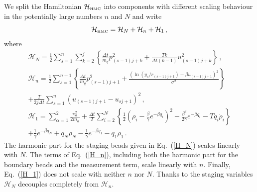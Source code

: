 \documentclass[12pt,a4paper,final]{iopart}
\begin{document}
We split the Hamiltonian $\mathcal{H}_{\mbox{\tiny HMC}}$ into components with different scaling behaviour in the potentially large numbers $n$ and $N$ and write
\begin{equation}
  \mathcal{H}_{\mbox{\tiny HMC}}= \mathcal H_N+\mathcal H_n+\mathcal H_1\,,
\end{equation}
where
\begin{eqnarray}
  \mathcal H_N =
  \frac{1}{2}
  \sum_{s=1}^{n}
  \sum_{k=2}^j
  \left\{
    \frac{\Delta t}{m_q}p_{(s-1)j+k}^2
    +
    \frac{Tk}{\Delta t(k-1)}
    u_{(s-1)j+k}^2
  \right\}\,,\label{H_N}
  \\
  \mathcal H_n =
  \frac{1}{2}
  \sum_{s=1}^{n+1}
  \left\{
   \frac{\Delta t }{m_q}p_{(s-1)j+1}^2
    +
    \frac{(\ln(y_s/r_{(s-1)j+1}) - {\beta u_{(s-1)j+1}})^2}{\sigma^2}
   \right\} \nonumber
   \\
  +
  \frac{T}{2j\Delta t}
  \sum_{s=1}^{n}
    (u_{(s-1)j+1} - u_{sj+1})^2
   \,, \label{H_n} \\
  \mathcal H_1=
   \sum_{\alpha=1}^2\frac{\pi_\alpha^2}{2m_\alpha}
   +
  \frac{\Delta t}{T}
   \sum_{i=2}^{N}
   \left\{
    \frac{1}{2}
     \left(
        \rho_i-\frac{\beta}{\gamma}e^{-\beta q_i}
     \right)^2
    -
    \frac{\beta^2}{2\gamma}
    e^{-\beta q_i}
   -
    T q_i\dot\rho_i
   \right\} \nonumber
  \\
  +
  \frac{1}{\gamma}
  e^{-\beta q_N}
  +
  q_N \rho_{N}
  -
  \frac{1}{\gamma}
  e^{-\beta q_1}
  -
  q_1 \rho_{1} \,. \label{H_1}
\end{eqnarray}
The harmonic part for the staging beads given in Eq.~(\ref{H_N}) scales linearly with $N$. The terms of Eq.~(\ref{H_n}), including both the harmonic part for the boundary beads and the measurement term, scale linearly with $n$. Finally, Eq.~(\ref{H_1}) does not scale with neither $n$ nor $N$.
Thanks to the staging variables $\mathcal H_N$ decouples completely from $\mathcal H_n$.
\end{document}
